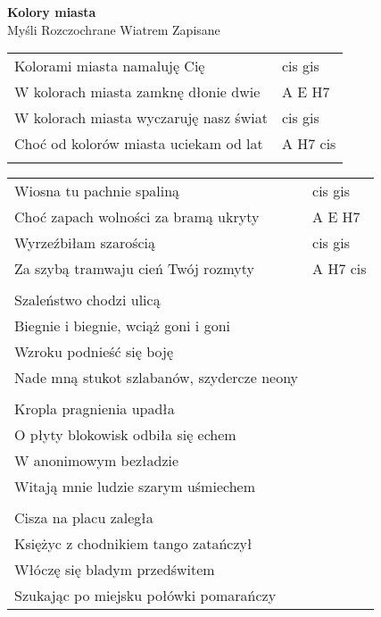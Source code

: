\documentclass[a5paper]{article}
\begin{document}


\noindent
\fontsize{12pt}{15pt}\selectfont
\textbf{Kolory miasta} \\
\fontsize{8pt}{10pt}\selectfont
Myśli Rozczochrane Wiatrem Zapisane \\
\fontsize{10pt}{12pt}\selectfont

\begin{tabular}{@{}p{7.50cm}p{3cm}@{}}
\noindent
Kolorami miasta namaluję Cię & cis gis \\
W kolorach miasta zamknę dłonie dwie & A E H7 \\
W kolorach miasta wyczaruję nasz świat & cis gis \\
Choć od kolorów miasta uciekam od lat & A H7 cis \\ \\
\end{tabular}

\noindent
\begin{tabular}{@{}p{8.50cm}p{3cm}@{}}
Wiosna tu pachnie spaliną & cis gis \\
Choć zapach wolności za bramą ukryty & A E H7 \\
Wyrzeźbiłam szarością & cis gis \\
Za szybą tramwaju cień Twój rozmyty & A H7 cis \\ \\

Szaleństwo chodzi ulicą \\
Biegnie i biegnie, wciąż goni i goni \\
Wzroku podnieść się boję \\
Nade mną stukot szlabanów, szydercze neony \\ \\

Kropla pragnienia upadła \\
O płyty blokowisk odbiła się echem \\
W anonimowym bezładzie \\
Witają mnie ludzie szarym uśmiechem \\ \\

Cisza na placu zaległa \\
Księżyc z chodnikiem tango zatańczył \\
Włóczę się bladym przedświtem \\
Szukając po miejsku połówki pomarańczy
\end{tabular}
\end{document}
